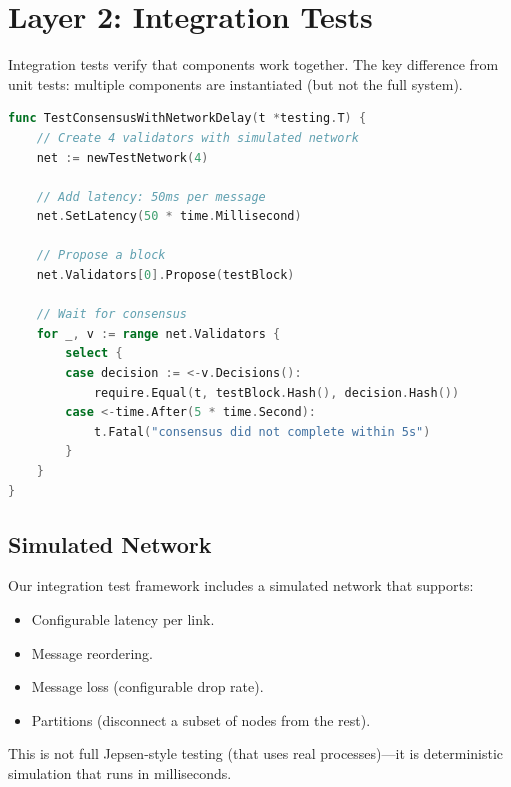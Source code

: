\section{Layer 2: Integration Tests}


Integration tests verify that components work together. The key difference from unit
tests: multiple components are instantiated (but not the full system).

\begin{lstlisting}[language=Go,caption={Integration test for consensus + networking}]
func TestConsensusWithNetworkDelay(t *testing.T) {
    // Create 4 validators with simulated network
    net := newTestNetwork(4)

    // Add latency: 50ms per message
    net.SetLatency(50 * time.Millisecond)

    // Propose a block
    net.Validators[0].Propose(testBlock)

    // Wait for consensus
    for _, v := range net.Validators {
        select {
        case decision := <-v.Decisions():
            require.Equal(t, testBlock.Hash(), decision.Hash())
        case <-time.After(5 * time.Second):
            t.Fatal("consensus did not complete within 5s")
        }
    }
}
\end{lstlisting}

\subsection{Simulated Network}

Our integration test framework includes a simulated network that supports:
\begin{itemize}[nosep]
  \item Configurable latency per link.
  \item Message reordering.
  \item Message loss (configurable drop rate).
  \item Partitions (disconnect a subset of nodes from the rest).
\end{itemize}

This is not full Jepsen-style testing (that uses real processes)---it is deterministic
simulation that runs in milliseconds.

